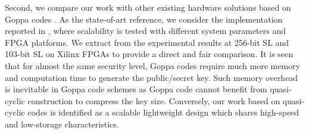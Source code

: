 \documentclass[runningheads]{llncs}
\begin{document}
\begin{table}[!t]\centering
\caption{Performance comparison of our FPGA implementation with other code-based key generators.}
\label{table:compare}
\begin{minipage}{\textwidth}\centering
{}
\end{minipage}
\end{table}

Second, we compare our work with other existing hardware solutions based on Goppa codes \cite{wang2018fpga,shoufan2010novel}. As the state-of-art reference, we consider the implementation reported in \cite{wang2018fpga}, where scalability is tested with different system parameters and FPGA platforms. We extract from \cite{wang2018fpga} the experimental results at 256-bit SL and 103-bit SL on Xilinx FPGAs to provide a direct and fair comparison.
It is seen that for almost the same security level, Goppa codes require much more memory and computation time to generate the public/secret key. Such memory overhead is inevitable in Goppa code schemes as Goppa code cannot benefit from quasi-cyclic construction to compress the key size.
Conversely, our work based on quasi-cyclic codes is identified as a scalable lightweight design which shares high-speed and low-storage characteristics.
\end{document}
